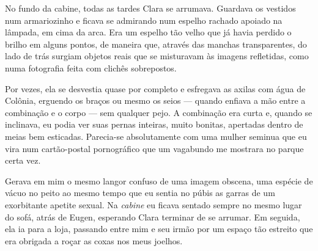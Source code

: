 



No fundo da cabine, todas as tardes Clara se arrumava. Guardava os vestidos
num armariozinho e ficava se admirando num espelho rachado apoiado na
lâmpada, em cima da arca. Era um espelho tão velho que já havia perdido o
brilho em alguns pontos, de maneira que, através das manchas transparentes,
do lado de trás surgiam objetos reais que se misturavam às imagens
refletidas, como numa fotografia feita com clichês sobrepostos.

Por vezes, ela se desvestia quase por completo e esfregava as axilas com água
de Colônia, erguendo os braços ou mesmo os seios --- quando enfiava a mão
entre a combinação e o corpo --- sem qualquer pejo. A combinação era curta e,
quando se inclinava, eu podia ver suas pernas inteiras, muito bonitas,
apertadas dentro de meias bem esticadas. Parecia-se absolutamente com uma
mulher seminua que eu vira num cartão-postal pornográfico que um vagabundo me
mostrara no parque certa vez.

Gerava em mim o mesmo langor confuso de uma imagem obscena, uma espécie de
vácuo no peito ao mesmo tempo que eu sentia no púbis as garras de um
exorbitante apetite sexual. Na \textit{cabine} eu ficava sentado sempre no
mesmo lugar do sofá, atrás de Eugen, esperando Clara terminar de se arrumar.
Em seguida, ela ia para a loja, passando entre mim e seu irmão por um espaço
tão estreito que era obrigada a roçar as coxas nos meus joelhos.

